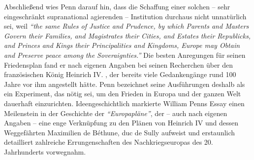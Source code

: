 Abschließend wies Penn darauf hin, dass die Schaffung einer solchen -- sehr
eingeschränkt supranational agierenden -- Institution durchaus nicht unnatürlich
sei, weil \textit{"`the same Rules of Justice and Prudence, by which Parents and
Masters Govern their Families, and Magistrates their Cities, and Estates their
Republicks, and Princes and Kings their Principalities and Kingdoms, Europe may
Obtain and Preserve peace among the Soveraignties."'} Die besten Anregungen für
seinen Friedensplan fand er nach eigenen Angaben bei seinen Recherchen über den
französischen König Heinrich IV. , der bereits
viele Gedankengänge rund 100 Jahre vor ihm angestellt hätte. Penn bezeichnet
seine Ausführungen deshalb als ein Experiment, das nötig sei, um den Frieden in
Europa und der ganzen Welt dauerhaft einzurichten. Ideengeschichtlich markierte
William Penns Essay einen Meilenstein in der Geschichte der \textit{"`Europapläne"'}, der --
auch nach eigenen Angaben -- eine enge Verknüpfung zu den Plänen von Heinrich IV 
und dessen Weggefährten Maximilien de Béthune, duc de Sully  aufweist und
erstaunlich detailliert zahlreiche Errungenschaften des Nachkriegseuropas des
20. Jahrhunderts vorwegnahm.


